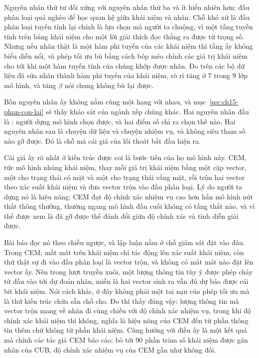 %
Nguyên nhân thứ tư đối xứng với nguyên nhân thứ ba và ít hiển nhiên hơn: đầu
phân loại quá nghèo để học quan hệ giữa khái niệm và nhãn. Chỗ khó xử là đầu
phân loại tuyến tính lại chính là lựa chọn mà người ta chuộng, vì một tầng tuyến
tính trên bảng khái niệm cho một lời giải thích đọc thẳng ra được từ trọng số.
Nhưng nếu nhãn thật là một hàm phi tuyến của các khái niệm thì tầng ấy không
biểu diễn nổi, và phép tối ưu bù bằng cách bóp méo chính các giá trị khái niệm
cho tới khi một hàm tuyến tính của chúng khớp được nhãn. Đo trên các bộ dữ liệu
đã sửa nhãn thành hàm phi tuyến của khái niệm, rò rỉ tăng ở 7 trong 9 lớp mô
hình, và tăng $\beta$ nói chung không bù lại được.

%
Bốn nguyên nhân ấy không nằm cùng một hạng với nhau, và
mục~\ref{sec:ch15-phan-con-lai} sẽ thấy khảo sát của ngành xếp chúng khác. Hai
nguyên nhân đầu là : người dựng mô hình chọn
được, và hai điểm số
chỉ ra chọn thế nào. Hai nguyên nhân sau là chuyện dữ liệu và chuyện nhiệm vụ,
và không siêu tham số nào gỡ được. Đó là chỗ mà cái giá của lối thoát bắt đầu
hiện ra.

%
Cái giá ấy rõ nhất ở kiến trúc được coi là bước tiến của họ mô hình này. CEM,
tức mô hình nhúng khái niệm, thay mỗi giá trị khái niệm bằng một cặp vector, một
cho trạng thái có mặt và một cho trạng thái vắng mặt, rồi trộn hai vector theo
xác suất khái niệm và đưa vector trộn vào đầu phân loại. Lý do người ta dựng nó
là hiệu năng: CEM đạt độ chính xác nhiệm vụ cao hơn hẳn mô hình nút thắt thông
thường, thường ngang mô hình đầu cuối không có tầng thắt nào, và vì thế được xem
là đã gỡ được thế đánh đổi giữa độ chính xác và tính diễn giải được.

%
Bài báo đọc nó theo chiều ngược, và lập luận nằm ở chỗ giám sát đặt vào đâu.
Trong CEM, mất mát trên khái niệm chỉ tác động lên xác suất khái niệm, còn thứ
thật sự đi vào đầu phân loại là vector trộn, và không có mất mát nào đặt lên
vector ấy. Nên trong lượt truyền xuôi, một lượng thông tin tùy ý được phép chảy
từ đầu vào tới dự đoán nhãn, miễn là hai vector sinh ra vẫn đủ dự báo được cái
bit khái niệm. Nói cách khác,
 ở đây không phải một tai
nạn của phép tối ưu mà là thứ kiến trúc chừa sẵn chỗ cho. Đo thì thấy đúng vậy:
lượng thông tin mà vector trộn mang về nhãn đi cùng chiều với độ chính xác nhiệm
vụ, trong khi độ chính xác khái niệm thì không, nghĩa là hiệu năng của CEM đến
từ phần thông tin thêm chứ không từ phần khái niệm. Cùng hướng với điều ấy là một
kết quả mà chính các tác giả CEM báo cáo: bỏ tới 90 phần trăm số khái niệm được
gán nhãn của CUB, độ chính xác nhiệm vụ của CEM gần như không đổi.


